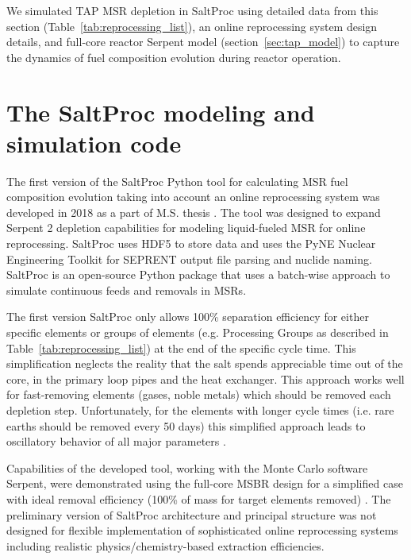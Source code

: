 \documentclass[12pt]{article} %
\begin{document}
We simulated \gls{TAP} \gls{MSR} depletion in SaltProc using detailed data from
 this section (Table~\ref{tab:reprocessing_list}), an online reprocessing 
system design details, and full-core reactor Serpent model (section~\ref{sec:tap_model})
 to capture the dynamics of fuel composition evolution during reactor operation.

\section{The SaltProc modeling and simulation code} \label{sec:tool}
The first version of the SaltProc Python tool for calculating \gls{MSR} fuel 
composition evolution taking into account an online reprocessing system 
was developed in 2018 as a part of M.S. thesis \cite{rykhlevskii_advanced_2018,
rykhlevskii_arfc/saltproc_2018}. The tool was designed to 
expand Serpent 2 depletion capabilities for modeling liquid-fueled \gls{MSR} 
for online reprocessing. SaltProc uses HDF5 
\cite{the_hdf_group_hierarchical_1997} to store 
data and uses the PyNE Nuclear Engineering Toolkit \cite{scopatz_pyne_2012}
for SEPRENT output file parsing and nuclide naming. SaltProc is an 
open-source Python package that uses a batch-wise approach to simulate 
continuous feeds and removals in \glspl{MSR}. 

The first version SaltProc only allows 100\% separation efficiency for 
either specific elements or groups of elements (e.g. Processing Groups as described in 
Table~\ref{tab:reprocessing_list}) at the end of the specific cycle time. 
This simplification neglects the reality that the salt spends appreciable time 
out of the core, in the primary loop pipes and the heat exchanger. This approach 
works well for fast-removing elements (gases, noble metals) 
which should be removed each depletion step. Unfortunately, 
for the elements with longer cycle times (i.e. rare earths should be removed 
every 50 days) this simplified approach leads to oscillatory behavior of all
major parameters \cite{rykhlevskii_modeling_2019}. 

Capabilities of the developed tool, working with the Monte Carlo software 
Serpent, were demonstrated using the full-core MSBR design for a 
simplified case with ideal removal efficiency (100\% of mass for target 
elements removed) \cite{rykhlevskii_modeling_2019}. The preliminary version of 
SaltProc architecture and principal structure was not designed for 
flexible implementation of sophisticated online reprocessing systems 
including realistic physics/chemistry-based extraction efficiencies. 
\end{document}
